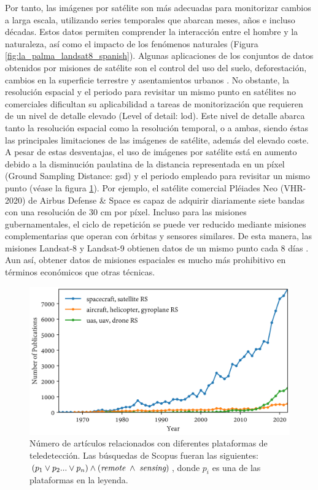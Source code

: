 Por tanto, las imágenes por satélite son más adecuadas para monitorizar cambios a larga escala, utilizando series temporales que abarcan meses, años e incluso décadas. Estos datos permiten comprender la interacción entre el hombre y la naturaleza, así como el impacto de los fenómenos naturales (Figura \ref{fig:la_palma_landsat8_spanish}). Algunas aplicaciones de los conjuntos de datos obtenidos por misiones de satélite son el control del uso del suelo, deforestación, cambios en la superficie terrestre y asentamientos urbanos \cite{asokan_change_2019}. No obstante, la resolución espacial y el periodo para revisitar un mismo punto en satélites no comerciales dificultan su aplicabilidad a tareas de monitorización que requieren de un nivel de detalle elevado (Level of detail: \acrshort{lod}). Este nivel de detalle abarca tanto la resolución espacial como la resolución temporal, o a ambas, siendo éstas las principales limitaciones de las imágenes de satélite, además del elevado coste. A pesar de estas desventajas, el uso de imágenes por satélite está en aumento debido a la disminución paulatina de la distancia representada en un píxel (Ground Sampling Distance: \acrshort{gsd}) y el periodo empleado para revisitar un mismo punto (véase la figura \ref{fig:scopus_search_platforms_spanish}). Por ejemplo, el satélite comercial Pléiades Neo (VHR-2020) de Airbus Defense \& Space \cite{airbus_pleiades_2021} es capaz de adquirir diariamente siete bandas con una resolución de 30 \si{\centi\meter} por píxel. Incluso para las misiones gubernamentales, el ciclo de repetición se puede ver reducido mediante misiones complementarias que operan con órbitas y sensores similares. De esta manera, las misiones Landsat-8 y Landsat-9 obtienen datos de un mismo punto cada 8 días \cite{masek_landsat_2020}. Aun así, obtener datos de misiones espaciales es mucho más prohibitivo en términos económicos que otras técnicas.

\begin{figure}[!ht]
	\includegraphics[width=\linewidth]{figs/introduction/platform_timeline.png}
	\caption{Número de artículos relacionados con diferentes plataformas de teledetección. Las búsquedas de Scopus fueran las siguientes: $(p_1 \lor p_2 ... \lor p_n) \land (\textit{remote} \hspace{1mm} \land \hspace{1mm} \textit{sensing})$, donde $p_i$ es una de las plataformas en la leyenda. }
    \label{fig:scopus_search_platforms_spanish}
\end{figure}

